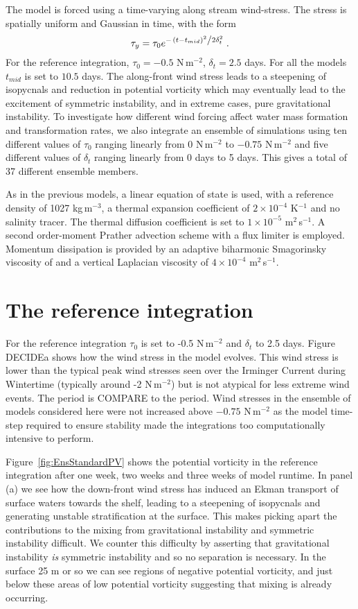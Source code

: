The model is forced using a time-varying along stream wind-stress. The stress is spatially uniform and Gaussian in time, with the form
\begin{equation}
    \tau_y = \tau_0 e^{-\flatfrac{(t - t_{mid})^2}{2\delta_t^2}} \, .
\end{equation}
For the reference integration, $\tau_0 = - 0.5$ N\,m$^{-2}$, $\delta_t = 2.5$ days. For all the models $t_{mid}$ is set to $10.5$ days. The along-front wind stress leads to a steepening of isopycnals and reduction in potential vorticity which may eventually lead to the excitement of symmetric instability, and in extreme cases, pure gravitational instability. To investigate how different wind forcing affect water mass formation and transformation rates, we also integrate an ensemble of simulations using ten different values of $\tau_0$ ranging linearly from $0$ N\,m$^{-2}$ to $-0.75$ N\,m$^{-2}$ and five different values of $\delta_t$ ranging linearly from 0 days to 5 days. This gives a total of 37 different ensemble members.

As in the previous models, a linear equation of state is used, with a reference density of 1027 kg\,m$^{-3}$, a thermal expansion coefficient of $2 \times 10^{-4}$ K$^{-1}$ and no salinity tracer. The thermal diffusion coefficient is set to $1 \times 10^{-5}$ m$^2$\,s$^{-1}$. A second order-moment Prather advection scheme with a flux limiter is employed. Momentum dissipation is provided by an adaptive biharmonic Smagorinsky viscosity of and a vertical Laplacian viscosity of $4 \times 10^{-4}$ m$^2$\,s$^{-1}$.  

\section{The reference integration}
\label{sec:IrmRef}
For the reference integration $\tau_0$ is set to -0.5 N\,m$^{-2}$ and $\delta_t$ to 2.5 days. Figure DECIDEa shows how the wind stress in the model evolves. This wind stress is lower than the typical peak wind stresses seen over the Irminger Current during Wintertime (typically around -2 N\,m$^{-2}$) but is not atypical for less extreme wind events. The period is COMPARE to the period. Wind stresses in the ensemble of models considered here were not increased above $-0.75$ N\,m$^{-2}$ as the model time-step required to ensure stability made the integrations too computationally intensive to perform.

Figure~\ref{fig:EnsStandardPV} shows the potential vorticity in the reference integration after one week, two weeks and three weeks of model runtime. In panel (a) we see how the down-front wind stress has induced an Ekman transport of surface waters towards the shelf, leading to a steepening of isopycnals and generating unstable stratification at the surface. This makes picking apart the contributions to the mixing from gravitational instability and symmetric instability difficult. We counter this difficulty by asserting that gravitational instability \textit{is} symmetric instability and so no separation is necessary. In the surface 25 m or so we can see regions of negative potential vorticity, and just below these areas of low potential vorticity suggesting that mixing is already occurring.

